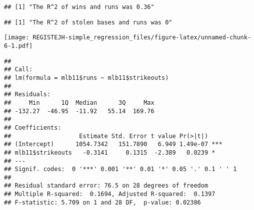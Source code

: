 \documentclass[
]{article}
\newenvironment{Shaded}{\begin{snugshade}}{\end{snugshade}}
\newcommand{\DecValTok}[1]{\textcolor[rgb]{0.00,0.00,0.81}{#1}}
\newcommand{\KeywordTok}[1]{\textcolor[rgb]{0.13,0.29,0.53}{\textbf{#1}}}
\newcommand{\NormalTok}[1]{#1}
\newcommand{\OperatorTok}[1]{\textcolor[rgb]{0.81,0.36,0.00}{\textbf{#1}}}
\newcommand{\StringTok}[1]{\textcolor[rgb]{0.31,0.60,0.02}{#1}}
\begin{document}
\begin{verbatim}
## [1] "The R^2 of wins and runs was 0.36"
\end{verbatim}

\begin{Shaded}
\end{Shaded}

\begin{verbatim}
## [1] "The R^2 of stolen bases and runs was 0"
\end{verbatim}

\begin{Shaded}
\end{Shaded}

\texttt{[image: REGISTEJH-simple\_regression\_files/figure-latex/unnamed-chunk-6-1.pdf]}

\begin{Shaded}
\end{Shaded}

\begin{verbatim}
## 
## Call:
## lm(formula = mlb11$runs ~ mlb11$strikeouts)
## 
## Residuals:
##     Min      1Q  Median      3Q     Max 
## -132.27  -46.95  -11.92   55.14  169.76 
## 
## Coefficients:
##                   Estimate Std. Error t value Pr(>|t|)    
## (Intercept)      1054.7342   151.7890   6.949 1.49e-07 ***
## mlb11$strikeouts   -0.3141     0.1315  -2.389   0.0239 *  
## ---
## Signif. codes:  0 '***' 0.001 '**' 0.01 '*' 0.05 '.' 0.1 ' ' 1
## 
## Residual standard error: 76.5 on 28 degrees of freedom
## Multiple R-squared:  0.1694, Adjusted R-squared:  0.1397 
## F-statistic: 5.709 on 1 and 28 DF,  p-value: 0.02386
\end{verbatim}
\end{document}

